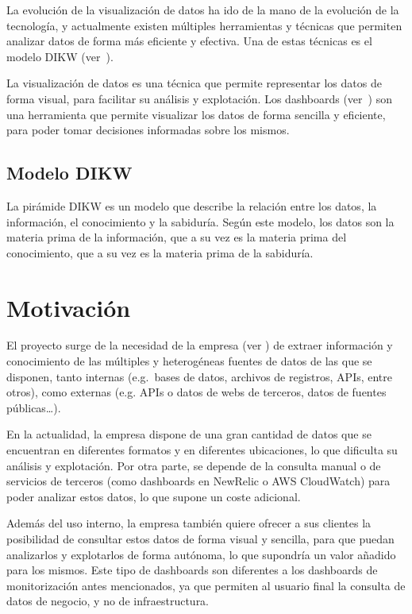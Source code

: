 La evolución de la visualización de datos ha ido de la mano de la evolución de la tecnología, y
actualmente existen múltiples herramientas y técnicas que permiten analizar datos de forma
más eficiente y efectiva. Una de estas técnicas es el modelo DIKW (ver~).

La visualización de datos es una técnica que permite representar los datos de forma visual, para
facilitar su análisis y explotación. Los dashboards (ver~) son una
herramienta que permite visualizar los datos de forma sencilla y eficiente, para poder tomar
decisiones informadas sobre los mismos.

\subsection{Modelo DIKW}\label{subsec:dikw}
La pirámide DIKW\cite{enwiki:1211227190} es un modelo que describe la relación entre los datos,
la información, el conocimiento y la sabiduría. Según este modelo, los datos son la materia prima
de la información, que a su vez es la materia prima del conocimiento, que a su vez es la materia
prima de la sabiduría.

\newpage{}

\section{Motivación}\label{sec:motivacion}
El proyecto surge de la necesidad de la empresa (ver ) de extraer información
y conocimiento de las múltiples y heterogéneas fuentes de datos de las que se disponen,
tanto internas (e.g.~bases de datos, archivos de registros, APIs, entre otros),
como externas (e.g. APIs o datos de webs de terceros, datos de fuentes públicas\ldots).

En la actualidad, la empresa dispone de una gran cantidad de datos que se encuentran en
diferentes formatos y en diferentes ubicaciones, lo que dificulta su análisis y explotación.
Por otra parte, se depende de la consulta manual o de servicios de terceros (como dashboards
en NewRelic o AWS CloudWatch) para poder analizar estos datos, lo que supone un coste adicional.

Además del uso interno, la empresa también quiere ofrecer a sus clientes la posibilidad de
consultar estos datos de forma visual y sencilla, para que puedan analizarlos y explotarlos de
forma autónoma, lo que supondría un valor añadido para los mismos. Este tipo de dashboards
son diferentes a los dashboards de monitorización antes mencionados, ya que permiten al usuario
final la consulta de datos de negocio, y no de infraestructura.

